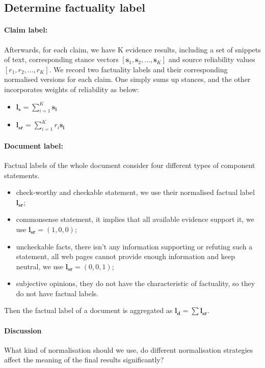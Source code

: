 \documentclass[11pt]{article}
\begin{document}
\subsection{Determine factuality label}
\paragraph{Claim label:}
Afterwards, for each claim, we have K evidence results, including a set of snippets of text, corresponding stance vectors $[\mathbf{s}_1, \mathbf{s}_2, \dots, \mathbf{s}_K]$ and source reliability values $[r_1, r_2, \dots, r_K]$.
We record two factuality labels and their corresponding normalised versions for each claim.
One simply sums up stances, and the other incorporates weights of reliability as below:
\begin{itemize}
    \item[(1)] $\mathbf{l_{s}} = \sum_{i=1}^{K} \mathbf{s_i}$
    \item[(2)] $\mathbf{l_{sr}} = \sum_{i=1}^{K} r_i \mathbf{s_i}$
\end{itemize}

\paragraph{Document label:}
Factual labels of the whole document consider four different types of component statements.
\begin{itemize}
    \item check-worthy and checkable statement, we use their normalised factual label $\mathbf{l_{sr}}$; 
    \item commonsense statement, it implies that all available evidence support it, we use $\mathbf{l_{sr}}=(1,0,0)$;
    \item uncheckable facts, there isn't any information supporting or refuting such a statement, all web pages cannot provide enough information and keep neutral, we use $\mathbf{l_{sr}}=(0,0,1)$;
    \item subjective opinions, they do not have the characteristic of factuality, so they do not have factual labels.
\end{itemize}
Then the factual label of a document is aggregated as $\mathbf{l_{d}} = \sum \mathbf{l_{sr}}$.


\paragraph{Discussion} 
What kind of normalisation should we use, do different normalisation strategies affect the meaning of the final results significantly?
\end{document}
